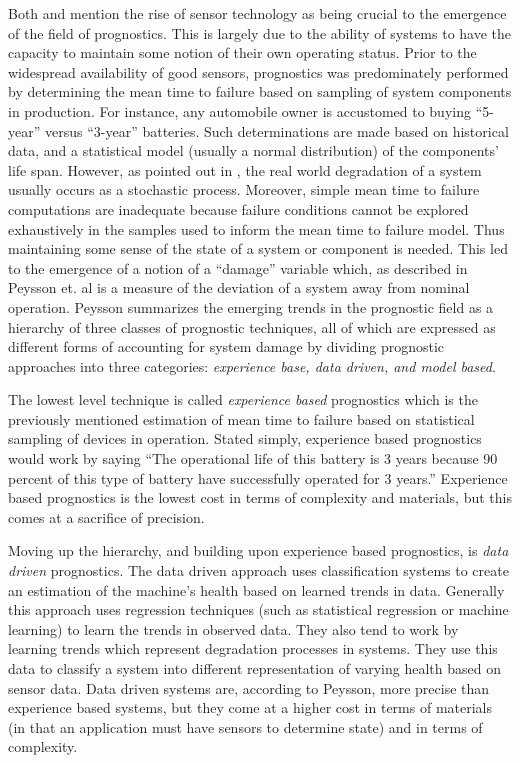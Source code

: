 \documentclass[12pt]{article}
\begin{document}
Both \cite{877920} and \cite{4585821} mention the rise of sensor
technology as being crucial to the emergence of the field of
prognostics.  This is largely due to the ability of systems to have
the capacity to maintain some notion of their own operating status.
Prior to the widespread availability of good sensors, prognostics was
predominately performed by determining the mean time to failure based
on sampling of system components in production.  For instance, any
automobile owner is accustomed to buying ``5-year'' versus ``3-year''
batteries.  Such determinations are made based on historical data, and
a statistical model (usually a normal distribution) of the components'
life span.  However, as pointed out in \cite{4711428}, the real world
degradation of a system usually occurs as a stochastic process.
Moreover, simple mean time to failure computations are inadequate
because failure conditions cannot be explored exhaustively in the
samples used to inform the mean time to failure model.  Thus
maintaining some sense of the state of a system or component is
needed.  This led to the emergence of a notion of a ``damage''
variable which, as described in Peysson et. al \cite{4711428} is a
measure of the deviation of a system away from nominal operation.
Peysson summarizes the emerging trends in the prognostic field as a
hierarchy of three classes of prognostic techniques, all of which are
expressed as different forms of accounting for system damage by
dividing prognostic approaches into three categories: {\em experience
  base, data driven, and model based}.

The lowest level technique is called {\em experience based}
prognostics which is the previously mentioned estimation of mean time
to failure based on statistical sampling of devices in operation.
Stated simply, experience based prognostics would work by saying ``The
operational life of this battery is 3 years because 90 percent of this
type of battery have successfully operated for 3 years.''  Experience
based prognostics is the lowest cost in terms of complexity and
materials, but this comes at a sacrifice of precision.

Moving up the hierarchy, and building upon experience based
prognostics, is {\em data driven} prognostics.  The data driven
approach uses classification systems to create an estimation of the
machine's health based on learned trends in data.  Generally this
approach uses regression techniques (such as statistical regression or
machine learning) to learn the trends in observed data.  They also
tend to work by learning trends which represent degradation processes
in systems.  They use this data to classify a system into different
representation of varying health based on sensor data.  Data driven
systems are, according to Peysson, more precise than experience based
systems, but they come at a higher cost in terms of materials (in that
an application must have sensors to determine state) and in terms of
complexity.
\end{document}
